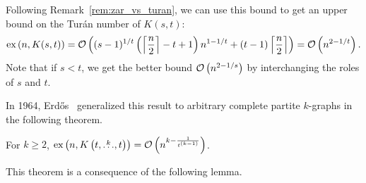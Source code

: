 \begin{remark}
    Following Remark~\ref{rem:zar_vs_turan}, we can use this bound to get an upper bound on the Turán number of $K(s, t)$:
    \[
        \text{ex} \left( n, K(s, t) \right) =
        \mathcal{O}\left((s - 1)^{1 / t}\left(\left\lceil\frac{n}{2}\right\rceil - t + 1\right)n^{1 - 1 / t} + (t - 1)\left\lceil\frac{n}{2}\right\rceil\right) =
        \mathcal{O}\left(n^{2 - 1 / t}\right).
    \]
    Note that if $s < t$, we get the better bound $\mathcal{O}\left(n^{2 - 1 / s}\right)$ by interchanging the roles of $s$ and $t$.
\end{remark}

In 1964, Erdős~\cite{Erods1964} generalized this result to arbitrary complete partite $k$-graphs in the following theorem.

\begin{theorem}\label{thm:erdos64}
    For $k \geq 2$,
    $\text{ex} \left( n, K\left(t, \overset{k}{\dots}, t\right) \right) = \mathcal{O}\left(n^{k - \frac{1}{t^{(k-1)}}}\right)$.
\end{theorem}

This theorem is a consequence of the following lemma.

